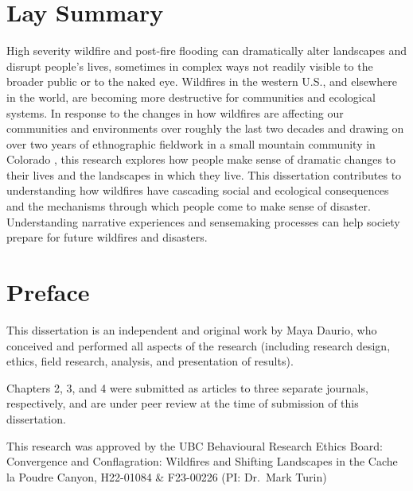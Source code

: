 \documentclass[
]{article}
\begin{document}
\clearpage

\section*{Lay Summary}

High severity wildfire and post-fire flooding can dramatically alter landscapes and disrupt people's lives, sometimes in complex ways not readily visible to the broader public or to the naked eye. Wildfires in the western U.S., and elsewhere in the world, are becoming more destructive for communities and ecological systems. In response to the changes in how wildfires are affecting our communities and environments over roughly the last two decades and drawing on over two years of ethnographic fieldwork in a small mountain community in Colorado , this research explores how people make sense of dramatic changes to their lives and the landscapes in which they live. This dissertation contributes to understanding how wildfires have cascading social and ecological consequences and the mechanisms through which people come to make sense of disaster. Understanding narrative experiences and sensemaking processes can help society prepare for future wildfires and disasters.

\clearpage

\section*{Preface}

This dissertation is an independent and original work by Maya Daurio, who conceived and
performed all aspects of the research (including research design, ethics, field research, analysis,
and presentation of results).

Chapters 2, 3, and 4 were submitted as articles to three separate journals, respectively, and are under peer review at the time of submission of this dissertation.

This research was approved by the UBC Behavioural Research Ethics Board:
Convergence and Conflagration: Wildfires and Shifting Landscapes in the Cache la Poudre Canyon, H22-01084 \& F23-00226 (PI: Dr.~Mark Turin)

\clearpage


\renewcommand*\contentsname{Table of Contents}
\end{document}
